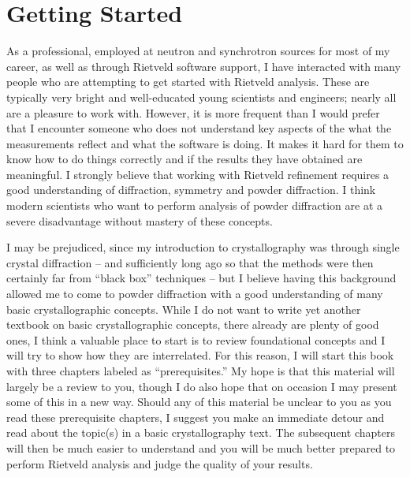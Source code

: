 \section{Getting Started}
As a professional, employed at neutron and synchrotron sources for most of my career, as well as through Rietveld software support, I have interacted with many people who are attempting to get started with Rietveld analysis. These are typically very bright and well-educated young scientists and engineers; nearly all are a pleasure to work with. However, it is more frequent than I would prefer that I encounter someone who does not understand key aspects of the what the measurements reflect and what the software is doing. It makes it hard for them to know how to do things correctly and if the results they have obtained are meaningful. I strongly believe that working with Rietveld refinement requires a good understanding of diffraction, symmetry and powder diffraction. I think modern scientists who want to perform analysis of powder diffraction are at a severe disadvantage without mastery of these concepts.

I may be prejudiced, since my introduction to crystallography was through single crystal diffraction – and sufficiently long ago so that the methods were then certainly far from “black box” techniques – but I believe having this background allowed me to come to powder diffraction with a good understanding of many basic crystallographic concepts. While I do not want to write yet another textbook on basic crystallographic concepts, there already are plenty of good ones, I think a valuable place to start is to review foundational concepts and I will try to show how they are interrelated. For this reason, I will start this book with three chapters labeled as “prerequisites.” My hope is that this material will largely be a review to you, though I do also hope that on occasion I may present some of this in a new way. Should any of this material be unclear to you as you read these prerequisite chapters, I suggest you make an immediate detour and read about the topic(s) in a basic crystallography text. The subsequent chapters will then be much easier to understand and you will be much better prepared to perform Rietveld analysis and judge the quality of your results. 